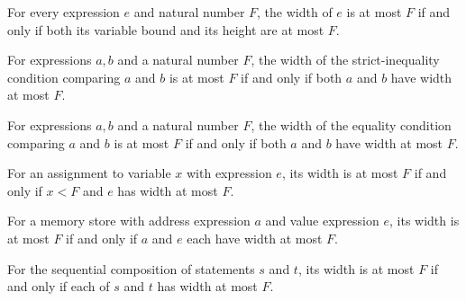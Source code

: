 \begin{theorem}
\label{Light.Expr.width_le_iff}
\leanok
{}
For every expression $e$ and natural number $F$, the width of $e$ is at most $F$ if and
only if both its variable bound and its height are at most $F$.
\end{theorem}

\begin{theorem}
\label{Light.Cond.width_lt_le_iff}
\leanok
{}
For expressions $a,b$ and a natural number $F$, the width of the strict-inequality
condition comparing $a$ and $b$ is at most $F$ if and only if both $a$ and $b$ have
width at most $F$.
\end{theorem}

\begin{theorem}
\label{Light.Cond.width_eq_le_iff}
\leanok
{}
For expressions $a,b$ and a natural number $F$, the width of the equality condition
comparing $a$ and $b$ is at most $F$ if and only if both $a$ and $b$ have width at most
$F$.
\end{theorem}

\begin{theorem}
\label{Light.Stmt.width_set_le_iff}
\leanok
{}
For an assignment to variable $x$ with expression $e$, its width is at most $F$ if and
only if $x<F$ and $e$ has width at most $F$.
\end{theorem}

\begin{theorem}
\label{Light.Stmt.width_store_le_iff}
\leanok
{}
For a memory store with address expression $a$ and value expression $e$, its width is at
most $F$ if and only if $a$ and $e$ each have width at most $F$.
\end{theorem}

\begin{theorem}
\label{Light.Stmt.width_seq_le_iff}
\leanok
{}
For the sequential composition of statements $s$ and $t$, its width is at most $F$ if
and only if each of $s$ and $t$ has width at most $F$.
\end{theorem}

